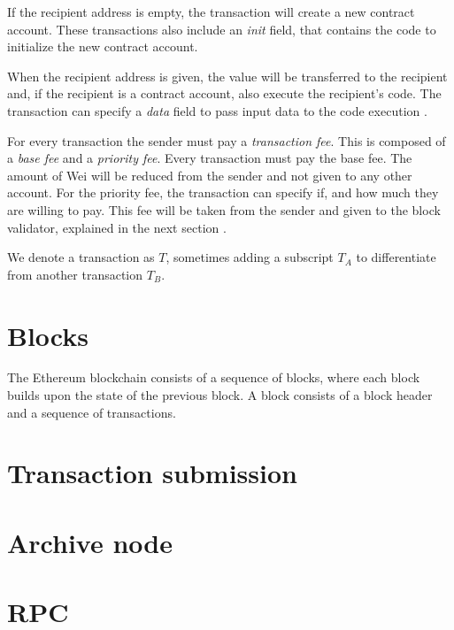 \documentclass[draft,final]{vutinfth} %
\begin{document}
If the recipient address is empty, the transaction will create a new contract account. These transactions also include an \emph{init} field, that contains the code to initialize the new contract account.

When the recipient address is given, the value will be transferred to the recipient and, if the recipient is a contract account, also execute the recipient's code. The transaction can specify a \emph{data} field to pass input data to the code execution \cite[p.4-5]{wood_ethereum_2024}.


For every transaction the sender must pay a \emph{transaction fee}. This is composed of a \emph{base fee} and a \emph{priority fee}. Every transaction must pay the base fee. The amount of Wei will be reduced from the sender and not given to any other account. For the priority fee, the transaction can specify if, and how much they are willing to pay. This fee will be taken from the sender and given to the block validator, explained in the next section \cite[p.8]{wood_ethereum_2024}.

We denote a transaction as $T$, sometimes adding a subscript $T_A$ to differentiate from another transaction $T_B$.


\section{Blocks}

The Ethereum blockchain consists of a sequence of blocks, where each block builds upon the state of the previous block. A block consists of a block header and a sequence of transactions.


\section{Transaction submission}

\section{Archive node}

\section{RPC}
\end{document}
